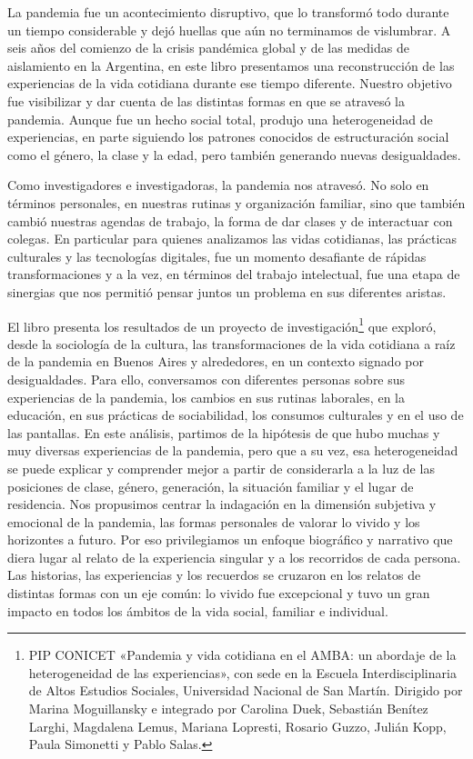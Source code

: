 
\begin{refsection}

\label{cap-21}

La pandemia fue un acontecimiento disruptivo, que lo transformó todo durante un tiempo considerable y dejó huellas que aún no terminamos de vislumbrar. A seis años del comienzo de la crisis pandémica global y de las medidas de aislamiento en la Argentina, en este libro presentamos una reconstrucción de las experiencias de la vida cotidiana durante ese tiempo diferente. Nuestro objetivo fue visibilizar y dar cuenta de las distintas formas en que se atravesó la pandemia. Aunque fue un hecho social total, produjo una heterogeneidad de experiencias, en parte siguiendo los patrones conocidos de estructuración social como el género, la clase y la edad, pero también generando nuevas desigualdades.

Como investigadores e investigadoras, la pandemia nos atravesó. No solo en términos personales, en nuestras rutinas y organización familiar, sino que también cambió nuestras agendas de trabajo, la forma de dar clases y de interactuar con colegas. En particular para quienes analizamos las vidas cotidianas, las prácticas culturales y las tecnologías digitales, fue un momento desafiante de rápidas transformaciones y a la vez, en términos del trabajo intelectual, fue una etapa de sinergias que nos permitió pensar juntos un problema en sus diferentes aristas.

El libro presenta los resultados de un proyecto de investigación\footnote{PIP CONICET «Pandemia y vida cotidiana en el AMBA: un abordaje
    de la heterogeneidad de las experiencias», con sede en la
    Escuela Interdisciplinaria de Altos Estudios Sociales, Universidad
    Nacional de San Martín. Dirigido por Marina Moguillansky e integrado
    por Carolina Duek, Sebastián Benítez Larghi, Magdalena Lemus, Mariana
    Lopresti, Rosario Guzzo, Julián Kopp, Paula Simonetti y Pablo Salas.} que exploró, desde la sociología de la cultura, las transformaciones de la vida cotidiana a raíz de la pandemia en Buenos Aires y alrededores, en un contexto signado por desigualdades. Para ello, conversamos con diferentes personas sobre sus experiencias de la pandemia, los cambios en sus rutinas laborales, en la educación, en sus prácticas de sociabilidad, los consumos culturales y en el uso de las pantallas. En este análisis, partimos de la hipótesis de que hubo muchas y muy diversas experiencias de la pandemia, pero que a su vez, esa heterogeneidad se puede explicar y comprender mejor a partir de considerarla a la luz de las posiciones de clase, género, generación, la situación familiar y el lugar de residencia. Nos propusimos centrar la indagación en la dimensión subjetiva y emocional de la pandemia, las formas personales de valorar lo vivido y los horizontes a futuro. Por eso privilegiamos un enfoque biográfico y narrativo que diera lugar al relato de la experiencia singular y a los recorridos de cada persona. Las historias, las experiencias y los recuerdos se cruzaron en los relatos de distintas formas con un eje común: lo vivido fue excepcional y tuvo un gran impacto en todos los ámbitos de la vida social, familiar e individual.


\end{refsection}
